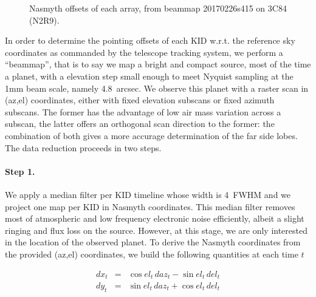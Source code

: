 \begin{figure}[ht]
\begin{center}
\caption{Nasmyth offsets of each array, from beammap 20170226s415 on
  3C84 (N2R9).}
\label{fig:fov_ex}
\end{center}
\end{figure}


In order to determine the pointing offsets of each KID w.r.t. the reference sky
coordinates as commanded by the telescope tracking system, we perform a
``beammap'', that is to say we map a bright and compact source, most of the time
a planet, with a elevation step small enough to meet Nyquist sampling at the 1mm
beam scale, namely 4.8~arcsec. We observe this planet with a raster scan in
(az,el) coordinates, either with fixed elevation subscans or fixed azimuth
subscans. The former has the advantage of low air mass variation across a
subscan, the latter offers an orthogonal scan direction to the former: the
combination of both gives a more accurage determination of the far side
lobes. The data reduction proceeds in two steps.

\paragraph{Step 1.} We apply a median filter per
KID timeline whose width is 4~FWHM and we project one map per KID in Nasmyth
coordinates. This median filter removes most of atmospheric and low frequency
electronic noise efficiently, albeit a slight ringing and flux loss on the
source. However, at this stage, we are only interested in the location of the
observed planet. To derive the Nasmyth coordinates from the provided (az,el)
coordinates, we build the following quantities at each time $t$

\begin{eqnarray}
dx_t &=& \cos el_t\, daz_t - \sin el_t\, del_t \nonumber \\
dy_t &=& \sin el_t\, daz_t + \cos el_t\, del_t \nonumber
\end{eqnarray}

